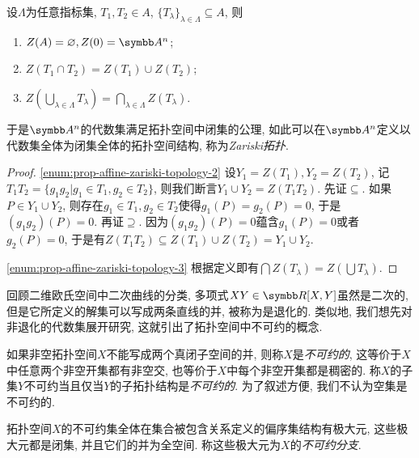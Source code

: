 \begin{proposition}\label{prop:affinezariskitopology}
  设$\Lambda$为任意指标集, $T_1, T_2\in A$, $\{T_\lambda\}_{\lambda\in\Lambda}\subseteq A$, 则
  \begin{enumerate}
    \item\label{enum:prop-affine-zariski-topology-1} $Z(A)=\varnothing, Z(0)=\AF^n$;
    \item\label{enum:prop-affine-zariski-topology-2} $Z(T_1\cap T_2)=Z(T_1)\cup Z(T_2)$;
    \item\label{enum:prop-affine-zariski-topology-3} $Z(\bigcup_{\lambda\in\Lambda} T_\lambda)=\bigcap_{\lambda\in\Lambda} Z(T_\lambda)$.
  \end{enumerate}
  于是$\AF^n$的代数集满足拓扑空间中闭集的公理, 如此可以在$\AF^n$定义以代数集全体为闭集全体的拓扑空间结构, 称为\emph{Zariski拓扑}.
\end{proposition}

\begin{proof}
  \ref{enum:prop-affine-zariski-topology-2} 设$Y_1=Z(T_1), Y_2 = Z(T_2)$, 记$T_1T_2=\{g_1g_2\vert g_1\in T_1, g_2\in T_2\}$, 则我们断言$Y_1\cup Y_2 = Z(T_1T_2)$. 先证$\subseteq$. 如果$P\in Y_1\cup Y_2$, 则存在$g_1\in T_1, g_2\in T_2$使得$g_1(P)=g_2(P)=0$, 于是$(g_1g_2)(P)=0$. 再证$\supseteq$. 因为$(g_1g_2)(P)=0$蕴含$g_1(P)=0$或者$g_2(P)=0$, 于是有$Z(T_1T_2)\subseteq Z(T_1)\cup Z(T_2)=Y_1\cup Y_2$.

  \ref{enum:prop-affine-zariski-topology-3} 根据定义即有$\bigcap Z(T_\lambda)=Z(\bigcup T_\lambda)$.
\end{proof}

回顾二维欧氏空间中二次曲线的分类, 多项式$XY\in \RR[X, Y]$虽然是二次的, 但是它所定义的解集可以写成两条直线的并, 被称为是退化的. 类似地, 我们想先对非退化的代数集展开研究, 这就引出了拓扑空间中不可约的概念.

如果非空拓扑空间$X$不能写成两个真闭子空间的并, 则称$X$是\emph{不可约的}, 这等价于$X$中任意两个非空开集都有非空交, 也等价于$X$中每个非空开集都是稠密的\parencite[13, Exercise 19]{atiyah_introduction_1969}. 称$X$的子集$Y$不可约当且仅当$Y$的子拓扑结构是\emph{不可约的}. 为了叙述方便, 我们不认为空集是不可约的.

\begin{proposition}
  拓扑空间$X$的不可约集全体在集合被包含关系定义的偏序集结构有极大元, 这些极大元都是闭集, 并且它们的并为全空间. 称这些极大元为$X$的\emph{不可约分支}.
\end{proposition}

